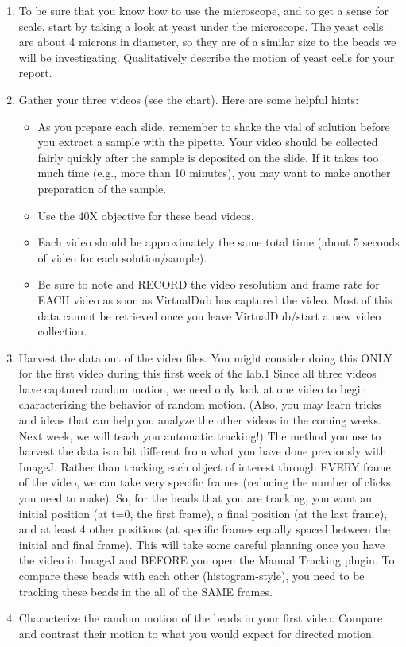 \begin{enumerate}
\item To be sure that you know how to use the microscope, and to get a sense for scale, start by taking a look at yeast under the microscope. The yeast cells are about 4 microns in diameter, so they are of a similar size to the beads we will be investigating. Qualitatively describe the motion of yeast cells for your report.
\item Gather your three videos (see the chart). Here are some helpful hints:
\begin{itemize}
\item As you prepare each slide, remember to shake the vial of solution before you extract a sample with the pipette. Your video should be collected fairly quickly after the sample is deposited on the slide. If it takes too much time (e.g., more than 10 minutes), you may want to make another preparation of the sample.
\item Use the 40X objective for these bead videos.
\item Each video should be approximately the same total time (about 5 seconds of video for each solution/sample).
\item Be sure to note and RECORD the video resolution and frame rate for EACH video as soon as VirtualDub has captured the video. Most of this data cannot be retrieved once you leave VirtualDub/start a new video collection.
\end{itemize}
\item Harvest the data out of the video files. You might consider doing this ONLY for the first video during this first week of the lab.1 Since all three videos have captured random motion, we need only look at one video to begin characterizing the behavior of random motion. (Also, you may learn tricks and ideas that can help you analyze the other videos in the coming weeks. Next week, we will teach you automatic tracking!) The method you use to harvest the data is a bit different from what you have done previously with ImageJ. Rather than tracking each object of interest through EVERY frame of the video, we can take very specific frames (reducing the number of clicks you need to make). So, for the beads that you are tracking, you want an initial position (at t=0, the first frame), a final position (at the last frame), and at least 4 other positions (at specific frames equally spaced between the initial and final frame). This will take some careful planning once you have the video in ImageJ and BEFORE you open the Manual Tracking plugin. To compare these beads with each other (histogram-style), you need to be tracking these beads in the all of the SAME frames.
\item Characterize the random motion of the beads in your first video. Compare and contrast their motion to what you would expect for directed motion.
\end{enumerate}
